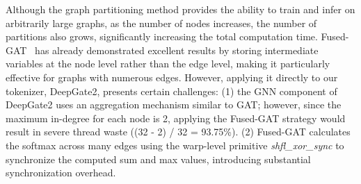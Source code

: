 Although the graph partitioning method provides the ability to train and infer on arbitrarily large graphs, as the number of nodes increases, the number of partitions also grows, significantly increasing the total computation time. 
Fused-GAT~\citep{fusegat} has already demonstrated excellent results by storing intermediate variables at the node level rather than the edge level, making it particularly effective for graphs with numerous edges. 
However, applying it directly to our tokenizer, \ie DeepGate2, presents certain challenges: (1) the GNN component of DeepGate2 uses an aggregation mechanism similar to GAT; however, since the maximum in-degree for each node is 2, applying the Fused-GAT strategy would result in severe thread waste ((32 - 2) / 32 = 93.75\%). (2) Fused-GAT calculates the softmax across many edges using the warp-level primitive \textit{shfl\_xor\_sync} to synchronize the computed sum and max values, introducing substantial synchronization overhead.

